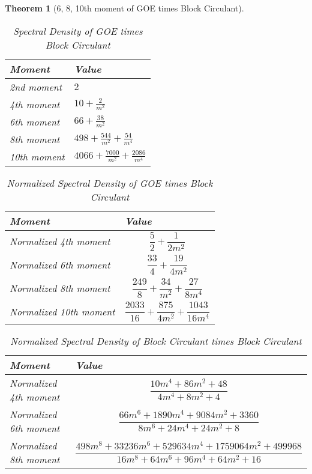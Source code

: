 \documentclass[12pt,reqno]{amsart}
\theoremstyle{plain} %
\newtheorem{theorem}{Theorem}[section]
\theoremstyle{remark}
\theoremstyle{definition}
\begin{document}
\begin{theorem}[6, 8, 10th moment of GOE times Block Circulant]
    
\begin{table}[h!]
\centering
\caption{Spectral Density of GOE times Block Circulant}
\renewcommand{\arraystretch}{1.5} %
\begin{tabular}{|>{\centering\arraybackslash}m{3cm}|>{\centering\arraybackslash}m{7cm}|}
\hline
\textbf{Moment} & \textbf{Value} \\
\hline
2nd moment & $2$ \\
\hline
4th moment & $10 + \frac{2}{m^2}$ \\
\hline
6th moment & $66 + \frac{38}{m^2}$ \\
\hline
8th moment & $498 + \frac{544}{m^2} + \frac{54}{m^4}$ \\
\hline
10th moment & $4066 + \frac{7000}{m^2} + \frac{2086}{m^4}$ \\
\hline
\end{tabular}
\end{table}


\begin{table}[h!]
\centering
\caption{Normalized Spectral Density of GOE times Block Circulant}
\renewcommand{\arraystretch}{1.5} %
\begin{tabular}{|>{\centering\arraybackslash}m{3cm}|>{\centering\arraybackslash}m{10cm}|}
\hline
\textbf{Moment} & \textbf{Value} \\
\hline
Normalized 4th moment & $$\frac{5}{2} + \frac{1}{2m^2}$$ \\
\hline
Normalized 6th moment & $$\frac{33}{4} + \frac{19}{4m^2}$$ \\
\hline
Normalized 8th moment & $$\frac{249}{8} + \frac{34}{m^2} + \frac{27}{8m^4}$$ \\
\hline
Normalized 10th moment & $$\frac{2033}{16} + \frac{875}{4m^2} + \frac{1043}{16m^4}$$ \\
\hline
\end{tabular}
\end{table}

\begin{table}[h!]
\centering
\caption{Normalized Spectral Density of Block Circulant times Block Circulant}
\renewcommand{\arraystretch}{1.5} %
\begin{tabular}{|>{\centering\arraybackslash}m{3cm}|>{\centering\arraybackslash}m{10cm}|}
\hline
\textbf{Moment} & \textbf{Value} \\
\hline
Normalized 4th moment & $$ \frac{10m^4 + 86m^2 + 48}{4m^4 + 8m^2 + 4}$$ \\
\hline
Normalized 6th moment & $$\frac{66m^6 + 1890m^4 + 9084m^2 + 3360}{8m^6 + 24m^4 + 24m^2 + 8}$$ \\
\hline
Normalized 8th moment & $$ \frac{498m^8 + 33236m^6 + 529634m^4 + 1759064m^2 + 499968}{16m^8 + 64m^6 + 96m^4 + 64m^2 + 16}$$ \\
\hline
\end{tabular}
\end{table}


\end{theorem}
\end{document}
